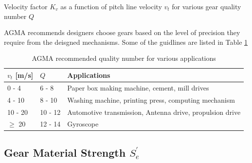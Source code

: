 \documentclass[a4paper,openany]{tufte-book}
\begin{document}
\begin{marginfigure}
  \centering
\caption{Velocity factor \(K_v\) as a function of pitch line velocity \(v_t\) for various gear quality number \(Q\)}
\end{marginfigure}

AGMA recommends designers choose gears based on the level of precision they require from the deisgned mechanisms. Some of the guidlines are listed in Table \ref{tab: AGMA recommended quality}

\begin{table}[htbp]
\caption{\label{tab: AGMA recommended quality}AGMA recommended quality number for various applications}
\centering
\begin{tabular}{llp{5cm}}
\toprule
\(v_{t}\) [m/s] & \(Q\) & Applications\\
\midrule
0 - 4 & 6 - 8 & Paper box making machine, cement, mill drives\\
4 - 10 & 8 - 10 & Washing machine, printing press, computing mechanism\\
10 - 20 & 10 - 12 & Automotive transmission, Antenna drive, propulsion drive\\
\(\geqslant\) 20 & 12 - 14 & Gyroscope\\
\bottomrule
\end{tabular}
\end{table}

\subsection{Gear Material Strength \(S_e^{\prime}\)}
\label{sec:org13e0af1}
\end{document}
